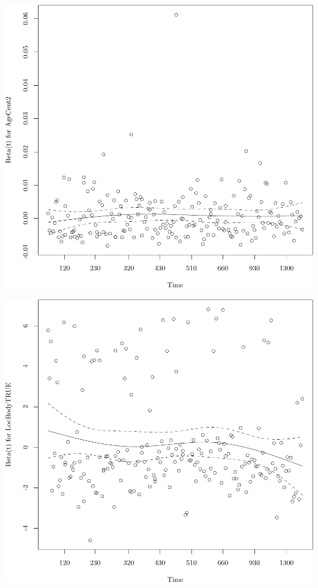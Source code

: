 \documentclass{article}
\begin{document}
\begin{knitrout}
{\centering \includegraphics[width=\maxwidth]{figure/05-eda-ph-check-full-3-2} 

}




{\centering \includegraphics[width=\maxwidth]{figure/05-eda-ph-check-full-3-3} 

}





\end{knitrout}
\end{document}
